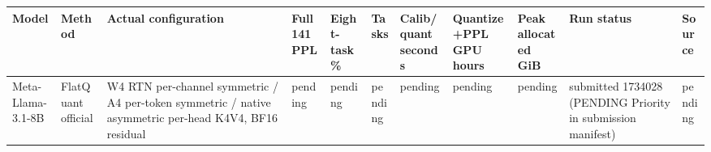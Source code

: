 \begin{tabular}{lllllllllll}
\toprule
Model & Method & Actual configuration & Full141 PPL & Eight-task \% & Tasks & Calib/quant seconds & Quantize+PPL GPU hours & Peak allocated GiB & Run status & Source \\
\midrule
Meta-Llama-3.1-8B & FlatQuant official & W4 RTN per-channel symmetric / A4 per-token symmetric / native asymmetric per-head K4V4, BF16 residual & pending & pending & pending & pending & pending & pending & submitted 1734028 (PENDING Priority in submission manifest) & pending \\
\bottomrule
\end{tabular}

